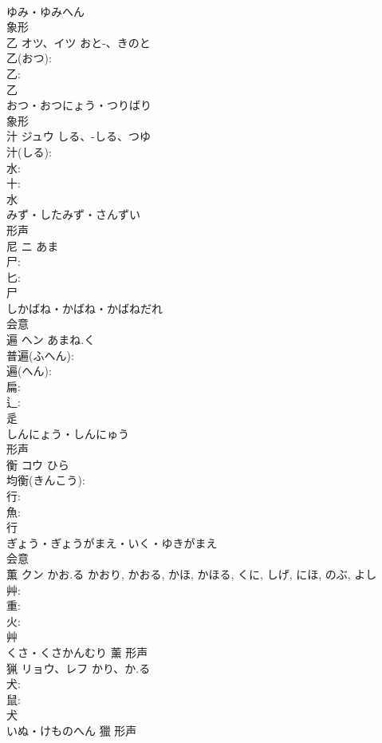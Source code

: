 \documentclass[8pt]{extreport}
\begin{document}
\begin{CJK}{UTF8}{min}
\\	ゆみ・ゆみへん	
\\	象形 
\\	乙	オツ、イツ	おと-、きのと		
\\	乙(おつ): 
\\	乙: 
\\	乙	
\\	おつ・おつにょう・つりばり	
\\	象形 
\\	汁	ジュウ	しる、-しる、つゆ		
\\	汁(しる): 
\\	水: 
\\	十: 
\\	水	
\\	みず・したみず・さんずい	
\\	形声 
\\	尼	ニ	あま		
\\	尸: 
\\	匕: 
\\	尸	
\\	しかばね・かばね・かばねだれ	
\\	会意 
\\	遍	ヘン	あまね.く		
\\	普遍(ふへん): 
\\	遍(へん): 
\\	扁: 
\\	辶: 
\\	辵	
\\	しんにょう・しんにゅう	
\\	形声 
\\	衡	コウ		ひら	
\\	均衡(きんこう): 
\\	行: 
\\	魚: 
\\	行	
\\	ぎょう・ぎょうがまえ・いく・ゆきがまえ	
\\	会意 
\\	薫	クン	かお.る	かおり, かおる, かほ, かほる, くに, しげ, にほ, のぶ, よし	
\\	艸: 
\\	重: 
\\	火: 
\\	艸	
\\	くさ・くさかんむり	薰	形声 
\\	猟	リョウ、レフ	かり、か.る		
\\	犬: 
\\	鼠: 
\\	犬	
\\	いぬ・けものへん	獵	形声 

\end{CJK}
\end{document}
